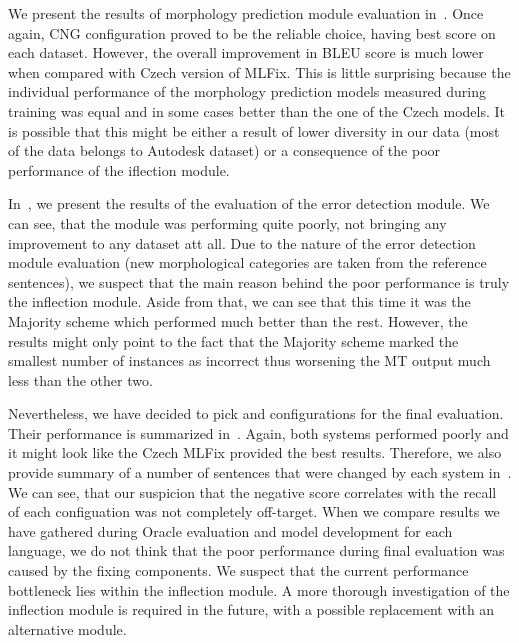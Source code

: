 We present the results of morphology prediction module evaluation in~.
Once again, CNG configuration proved to be the reliable choice, having best score on each dataset.
However, the overall improvement in BLEU score is much lower when compared with Czech version
of MLFix. This is little surprising because the individual performance of the morphology prediction
models measured during training was equal and in some cases better than the one of the Czech models.
It is possible that this might be either a result of lower diversity in our data (most of the data belongs
to Autodesk dataset) or a consequence of the poor performance of the iflection module.

In~, we present the results of the evaluation of the error detection module.
We can see, that the module was performing quite poorly, not bringing any improvement to any dataset att all. Due to the nature of the error detection module evaluation (new morphological categories are taken from the reference sentences), we suspect that the main reason behind the poor performance is truly the
inflection module. Aside from that, we can see that this time it was the Majority scheme which performed
 much better than the rest. However, the results might only point to the fact that the Majority scheme
 marked the smallest number of instances as incorrect thus worsening the MT output much less than the
 other two.

Nevertheless, we have decided to pick  and  configurations
for the final evaluation. Their performance is summarized in~. Again, both
systems performed poorly and it might look like the Czech MLFix provided the best results. Therefore,
we also provide summary of a number of sentences that were changed by each system in~.
We can see, that our suspicion that the negative score correlates with the recall of each configuation was not
completely off-target. When we compare results we have gathered during Oracle evaluation and model
development for each language, we do not think that the poor performance during final evaluation was caused by the fixing
components. We suspect that the current performance bottleneck lies within the inflection module.
A more thorough investigation of the inflection module is required in the future, with a possible
replacement with an alternative module.

